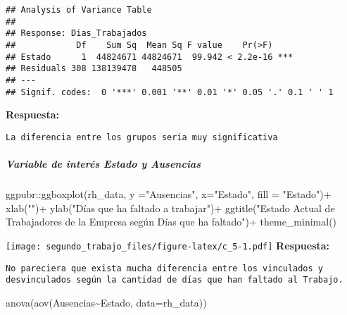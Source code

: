 \documentclass[
]{article}
\newenvironment{Shaded}{\begin{snugshade}}{\end{snugshade}}
\newcommand{\AttributeTok}[1]{\textcolor[rgb]{0.77,0.63,0.00}{#1}}
\newcommand{\FunctionTok}[1]{\textcolor[rgb]{0.00,0.00,0.00}{#1}}
\newcommand{\NormalTok}[1]{#1}
\newcommand{\SpecialCharTok}[1]{\textcolor[rgb]{0.00,0.00,0.00}{#1}}
\newcommand{\StringTok}[1]{\textcolor[rgb]{0.31,0.60,0.02}{#1}}
\begin{document}
\begin{verbatim}
## Analysis of Variance Table
## 
## Response: Dias_Trabajados
##            Df    Sum Sq  Mean Sq F value    Pr(>F)    
## Estado      1  44824671 44824671  99.942 < 2.2e-16 ***
## Residuals 308 138139478   448505                      
## ---
## Signif. codes:  0 '***' 0.001 '**' 0.01 '*' 0.05 '.' 0.1 ' ' 1
\end{verbatim}

\textbf{Respuesta:}

\begin{verbatim}
La diferencia entre los grupos seria muy significativa
\end{verbatim}

\hypertarget{variable-de-interuxe9s-estado-y-ausencias}{%
\subparagraph{Variable de interés Estado y
Ausencias}\label{variable-de-interuxe9s-estado-y-ausencias}}

\begin{Shaded}
\begin{Highlighting}[]
\NormalTok{ggpubr}\SpecialCharTok{::}\FunctionTok{ggboxplot}\NormalTok{(rh\_data, }\AttributeTok{y =}\StringTok{"Ausencias"}\NormalTok{, }\AttributeTok{x=}\StringTok{"Estado"}\NormalTok{, }\AttributeTok{fill =} \StringTok{"Estado"}\NormalTok{)}\SpecialCharTok{+}  
  \FunctionTok{xlab}\NormalTok{(}\StringTok{""}\NormalTok{)}\SpecialCharTok{+} \FunctionTok{ylab}\NormalTok{(}\StringTok{"Días que ha faltado a trabajar"}\NormalTok{)}\SpecialCharTok{+}
  \FunctionTok{ggtitle}\NormalTok{(}\StringTok{"Estado Actual de Trabajadores de la Empresa según Días que ha faltado"}\NormalTok{)}\SpecialCharTok{+} 
  \FunctionTok{theme\_minimal}\NormalTok{()}
\end{Highlighting}
\end{Shaded}

\texttt{[image: segundo\_trabajo\_files/figure-latex/c\_5-1.pdf]}
\textbf{Respuesta:}

\begin{verbatim}
No pareciera que exista mucha diferencia entre los vinculados y desvinculados según la cantidad de días que han faltado al Trabajo.
\end{verbatim}

\begin{Shaded}
\begin{Highlighting}[]
\FunctionTok{anova}\NormalTok{(}\FunctionTok{aov}\NormalTok{(Ausencias}\SpecialCharTok{\textasciitilde{}}\NormalTok{Estado, }\AttributeTok{data=}\NormalTok{rh\_data)) }
\end{Highlighting}
\end{Shaded}
\end{document}
